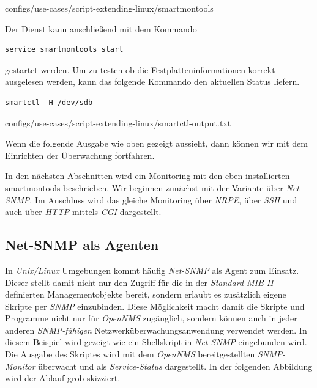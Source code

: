 
  {configs/use-cases/script-extending-linux/smartmontools}

Der Dienst kann anschließend mit dem Kommando

\begin{lstlisting}[numbers=none]
service smartmontools start
\end{lstlisting}

gestartet werden. Um zu testen ob die Festplatteninformationen korrekt ausgelesen werden, kann das folgende Kommando den aktuellen Status liefern.

\begin{lstlisting}[numbers=none]
smartctl -H /dev/sdb
\end{lstlisting}


  {configs/use-cases/script-extending-linux/smartctl-output.txt}

Wenn die folgende Ausgabe wie oben gezeigt aussieht, dann können wir mit dem Einrichten der Überwachung fortfahren.

In den nächsten Abschnitten wird ein Monitoring mit den eben installierten smartmontools beschrieben. Wir beginnen zunächst mit der Variante über \emph{Net-SNMP}. Im Anschluss wird das gleiche Monitoring über \emph{NRPE}, über \emph{SSH} und auch über \emph{HTTP} mittels \emph{CGI} dargestellt.

\subsection{Net-SNMP als Agenten}
In \emph{Unix/Linux} Umgebungen kommt häufig \emph{Net-SNMP} als Agent zum Einsatz. Dieser stellt damit nicht nur den Zugriff für die in der \emph{Standard MIB-II} definierten Managementobjekte bereit, sondern erlaubt es zusätzlich eigene Skripte per \emph{SNMP} einzubinden. Diese Möglichkeit macht damit die Skripte und Programme nicht nur für \emph{OpenNMS} zugänglich, sondern können auch in jeder anderen \emph{SNMP-fähigen} Netzwerküberwachungsanwendung verwendet werden. In diesem Beispiel wird gezeigt wie ein Shellskript in \emph{Net-SNMP} eingebunden wird. Die Ausgabe des Skriptes wird mit dem \emph{OpenNMS} bereitgestellten \emph{SNMP-Monitor} überwacht und als \emph{Service-Status} dargestellt. In der folgenden Abbildung wird der Ablauf grob skizziert.

